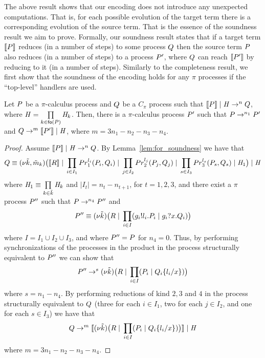 The above result shows that our encoding does not introduce any unexpected computations. That is, for each possible evolution of the target term there is a corresponding evolution of the source term. That is the essence of the soundness result we aim to prove.
Formally, our soundness result states that if a target term $\llbracket P \rrbracket$ reduces (in a number of steps) to some process $Q$ then the source term $P$ also reduces (in a number of steps) to a process $P'$, where $Q$ can reach $\llbracket P' \rrbracket$ by reducing to it (in a number of steps).  Similarly to the completeness result, we first show that the soundness of the encoding holds for any $\pi$ processes if the ``top-level'' handlers are used. 
 
 
 \begin{lemma}\label{lem:soundness_with_handlers}
Let $P$ be a $\pi$-calculus process and $Q$ be a $C_\pi$ process such that $\llbracket P \rrbracket \;|\; \mathit{H} \rightarrow^n Q$, where $\mathit{H}=\prod\limits_{k\in\mathsf{fo}(P)} \mathit{H}_{k}$. %
Then, there is a $\pi$-calculus process $P'$ such that $P\rightarrow^{n_1} P'$ and $Q\rightarrow^m \llbracket P' \rrbracket \;|\; \mathit{H}$, where $m=3n_1-n_2-n_3-n_4$. 
\end{lemma}

\begin{proof}
Assume $\llbracket P \rrbracket \;|\; \mathit{H} \rightarrow^n Q$. By Lemma~\ref{lem:for_soundness} we have that 
\[
Q\equiv (\nu \tilde{k},\tilde{m}_k)\big( \llbracket R \rrbracket \;|\; \prod\limits_{i\in I_1} Pr_1^{l_i}(P_i, Q_i) \;|\; \prod_{j\in I_2} Pr_2^{l_j}(P_j, Q_j) \;|\; \prod_{s\in I_3} Pr_3^{l_s}(P_s, Q_s) \;|\; \mathit{H}_1\big)\;|\; \mathit{H}
\]
where $\mathit{H}_1\equiv \prod\limits_{k\in\tilde{k}} \mathit{H}_k$ and $|I_t|=n_t-n_{t+1}$, for $t=1,2,3$, and there exist a $\pi$ process $P''$ such that $P\rightarrow^{n_4}P''$ and 
\[
P'' \equiv (\nu \tilde{k})\big(R \;|\; \prod\limits_{i \in I} (g_i!l_i.P_i  \;|\; g_i?x.Q_i)\big)
\]
where $I=I_1\cup I_2\cup I_3$, and where $P''=P$ for $n_4=0$. Thus, by performing synchronizations of the processes in the product in the process structurally equivalent to $P''$ we can show that 
\[
P''\rightarrow^{s}(\nu \tilde{k})\big(R \;|\; \prod\limits_{i \in I} (P_i  \;|\; Q_i\{l_i/x\})\big)
\]
%
where $s=n_1-n_4$. 
By performing reductions of kind $2,3$ and $4$ in the process structurally equivalent to $Q$ (three for each $i\in I_1$, two for each $j\in I_2$, and one for each $s\in I_3$) we have that
\[
Q\rightarrow^m \llbracket (\nu \tilde{k})\big(R \;|\; \prod\limits_{i \in I} (P_i  \;|\; Q_i\{l_i/x\})\big) \rrbracket\;|\; \mathit{H}
\]
where $m=3n_1-n_2-n_3-n_4$. 
\end{proof}
 
